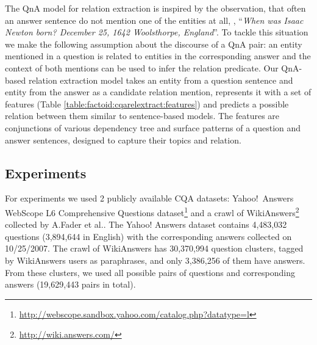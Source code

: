 The QnA model for relation extraction is inspired by the observation, that often an answer sentence do not mention one of the entities at all, \eg, ``\textit{When was Isaac Newton born? December 25, 1642 Woolsthorpe, England}''.
To tackle this situation we make the following assumption about the discourse of a QnA pair: an entity mentioned in a question is related to entities in the corresponding answer and the context of both mentions can be used to infer the relation predicate.
Our QnA-based relation extraction model takes an entity from a question sentence and entity from the answer as a candidate relation mention, represents it with a set of features (Table \ref{table:factoid:cqarelextract:features}) and predicts a possible relation between them similar to sentence-based models.
The features are conjunctions of various dependency tree and surface patterns of a question and answer sentences, designed to capture their topics and relation.

\subsection{Experiments}
\label{section:factoid:cqarelextract:experiments}

For experiments we used 2 publicly available CQA datasets: Yahoo!~Answers WebScope L6 Comprehensive Questions dataset\footnote{\href{url}{http://webscope.sandbox.yahoo.com/catalog.php?datatype=l}} and a crawl of WikiAnswers\footnote{\href{url}{http://wiki.answers.com/}} collected by A.Fader et al.\cite{Fader:2014:OQA:2623330.2623677}.
The Yahoo! Answers dataset contains 4,483,032 questions (3,894,644 in English) with the corresponding answers collected on 10/25/2007.
The crawl of WikiAnswers has 30,370,994 question clusters, tagged by WikiAnswers users as paraphrases, and only 3,386,256 of them have answers.
From these clusters, we used all possible pairs of questions and corresponding answers (19,629,443 pairs in total).

